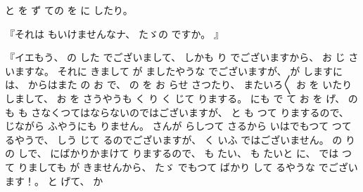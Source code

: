 と
を
ず
ての
を
に
したり。

『それは
もいけませんなナ、
%
たゞの
ですか。
』

『イエもう、
%
の
した
でございまして、
%
しかも
り
でございますから、
%
お
じ
さいますな。
%
それに
きまして
が
ましたやうな
でございますが、
%
が
しますには、
%
からはまた
の
お
で、
%
の
を
お
らせ
さつたり、
%
またいろ〳〵
お
を
いたりしまして、
%
お
を
さうやうも
く
り
く
じて
りまする。
%
にも
で
て
お
を
げ、
%
の
も
も
さなくつてはならないのではございますが、
%
と%
も
つて
りまするので、
%
じながら
ふやうにも
りません。
%
さんが
らしつて
さるから
いはでもつて
つて
るやうで、
%
しう
じて
るのでございますが、
%
く
いふ
ではございません。
%
の
りの
しで、
%
にばかりかまけて
りまするので、
%
も
たい、
%
も
たいと
に、
%
では
つて
りましても
が
きませんから、
%
たゞ
でもつて
ばかり
して
るやうな
でございます！。
%
と
げて、
%
か
